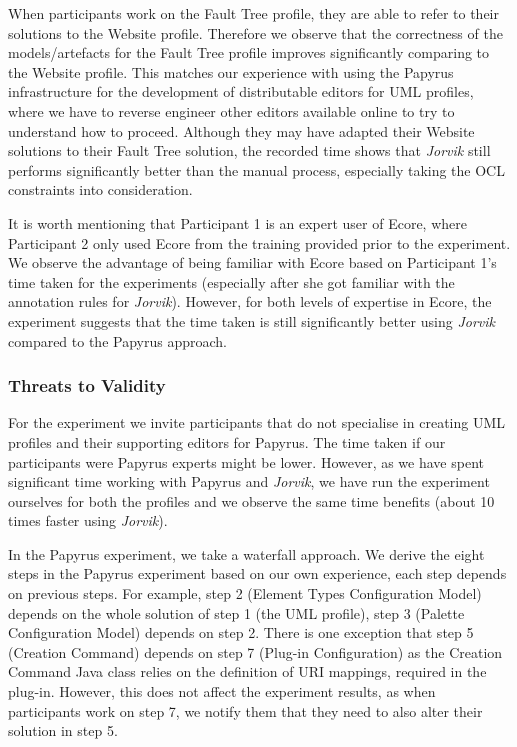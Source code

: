 When participants work on the Fault Tree profile, they are able to refer to their solutions to the Website profile. 
Therefore we observe that the correctness of the models/artefacts for the Fault Tree profile improves significantly comparing to the Website profile. 
This matches our experience with using the Papyrus infrastructure for the development of distributable editors for UML profiles, where we have to reverse engineer other editors available online to try to understand how to proceed.
Although they may have adapted their Website solutions to their Fault Tree solution, the recorded time shows that \textit{Jorvik} still performs significantly better than the manual process, especially taking the OCL constraints into consideration.

It is worth mentioning that Participant 1 is an expert user of Ecore, where Participant 2 only used Ecore from the training provided prior to the experiment. 
We observe the advantage of being familiar with Ecore based on Participant 1's time taken for the experiments (especially after she got familiar with the annotation rules for \textit{Jorvik}).
However, for both levels of expertise in Ecore, the experiment suggests that the time taken is still significantly better using \textit{Jorvik} compared to the Papyrus approach.

\subsubsection{Threats to Validity}
For the experiment we invite participants that do not specialise in creating UML profiles and their supporting editors for Papyrus. 
The time taken if our participants were Papyrus experts might be lower.
However, as we have spent significant time working with Papyrus and \textit{Jorvik}, we have run the experiment ourselves for both the profiles and we observe the same time benefits (about 10 times faster using \textit{Jorvik}). 

In the Papyrus experiment, we take a waterfall approach.
We derive the eight steps in the Papyrus experiment based on our own experience, each step depends on previous steps. 
For example, step 2 (Element Types Configuration Model) depends on the whole solution of step 1 (the UML profile), step 3 (Palette Configuration Model) depends on step 2. 
There is one exception that step 5 (Creation Command) depends on step 7 (Plug-in Configuration) as the Creation Command Java class relies on the definition of URI mappings, required in the plug-in. 
However, this does not affect the experiment results, as when participants work on step 7, we notify them that they need to also alter their solution in step 5.

